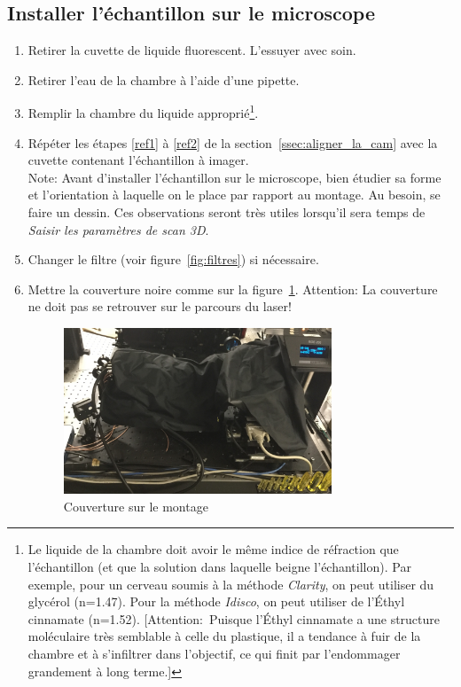 \subsection{Installer l'échantillon sur le microscope}
\begin{enumerate}
    \item Retirer la cuvette de liquide fluorescent. L'essuyer avec soin.
    \item Retirer l'eau de la chambre à l'aide d'une pipette.
    \item Remplir la chambre du liquide approprié\footnote{Le liquide de la chambre doit avoir le même indice de réfraction que l'échantillon (et que la solution dans laquelle beigne l'échantillon). Par exemple, pour un cerveau soumis à la méthode \textit{Clarity}, on peut utiliser du glycérol (n=1.47). Pour la méthode \textit{Idisco}, on peut utiliser de l'Éthyl cinnamate (n=1.52). [Attention:~Puisque l'Éthyl cinnamate a une structure moléculaire très semblable à celle du plastique, il a tendance à fuir de la chambre et à s'infiltrer dans l'objectif, ce qui finit par l'endommager grandement à long terme.]}.
    \item \label{observations} Répéter les étapes \ref{ref1} à \ref{ref2} de la section~\ref{ssec:aligner_la_cam} avec la cuvette contenant l'échantillon à imager.
    \\ Note: Avant d'installer l'échantillon sur le microscope, bien étudier sa forme et l'orientation à laquelle on le place par rapport au montage. Au besoin, se faire un dessin. Ces observations seront très utiles lorsqu'il sera temps de \textit{Saisir les paramètres de scan 3D}.
    
    \item Changer le filtre (voir figure~\ref{fig:filtres}) si nécessaire.
    \item Mettre la couverture noire comme sur la figure~\ref{fig:couverture}. Attention: La couverture ne doit pas se retrouver sur le parcours du laser!
        \begin{figure}[H]
        \centering
        \includegraphics[width=8cm]{couverture.jpg}
        \caption{Couverture sur le montage}
        \label{fig:couverture}
        \end{figure}
    

\end{enumerate}
